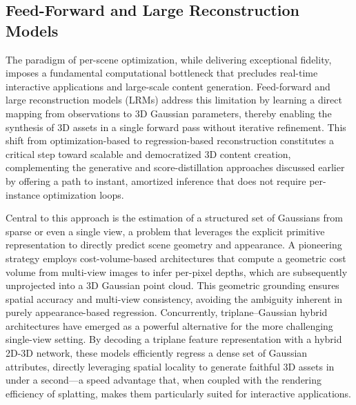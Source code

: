 \documentclass[11pt,a4paper]{article}
\begin{document}
\subsection{Feed-Forward and Large Reconstruction Models}


The paradigm of per-scene optimization, while delivering exceptional fidelity, imposes a fundamental computational bottleneck that precludes real-time interactive applications and large-scale content generation. Feed-forward and large reconstruction models (LRMs) address this limitation by learning a direct mapping from observations to 3D Gaussian parameters, thereby enabling the synthesis of 3D assets in a single forward pass without iterative refinement. This shift from optimization-based to regression-based reconstruction constitutes a critical step toward scalable and democratized 3D content creation, complementing the generative and score-distillation approaches discussed earlier by offering a path to instant, amortized inference that does not require per-instance optimization loops.

Central to this approach is the estimation of a structured set of Gaussians from sparse or even a single view, a problem that leverages the explicit primitive representation to directly predict scene geometry and appearance. A pioneering strategy employs cost-volume-based architectures that compute a geometric cost volume from multi-view images to infer per-pixel depths, which are subsequently unprojected into a 3D Gaussian point cloud. This geometric grounding ensures spatial accuracy and multi-view consistency, avoiding the ambiguity inherent in purely appearance-based regression. Concurrently, triplane--Gaussian hybrid architectures have emerged as a powerful alternative for the more challenging single-view setting. By decoding a triplane feature representation with a hybrid 2D-3D network, these models efficiently regress a dense set of Gaussian attributes, directly leveraging spatial locality to generate faithful 3D assets in under a second---a speed advantage that, when coupled with the rendering efficiency of splatting, makes them particularly suited for interactive applications.
\end{document}

